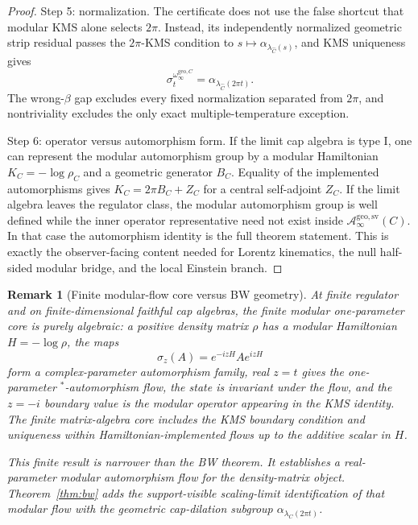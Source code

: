 \documentclass[11pt]{article}
\newtheorem{remark}[theorem]{Remark}
\begin{document}
\begin{proof}
Step 5: normalization. The certificate does not use the false shortcut that modular KMS alone
selects \(2\pi\). Instead, its independently normalized geometric strip residual passes the
\(2\pi\)-KMS condition to \(s\mapsto\alpha_{\lambda_{\widehat C}(s)}\), and KMS uniqueness gives
\[
\sigma_t^{\omega_\infty^{\mathrm{geo},C}}
=
\alpha_{\lambda_{\widehat C}(2\pi t)}.
\]
The wrong-\(\beta\) gap excludes every fixed normalization separated from \(2\pi\), and
nontriviality excludes the only exact multiple-temperature exception.

Step 6: operator versus automorphism form. If the limit cap algebra is type I, one can represent the modular automorphism group by a modular Hamiltonian \(K_C=-\log\rho_C\) and a geometric generator \(B_C\). Equality of the implemented automorphisms gives \(K_C=2\pi B_C+Z_C\) for a central self-adjoint \(Z_C\). If the limit algebra leaves the regulator class, the modular automorphism group is well defined while the inner operator representative need not exist inside \(\mathcal A_\infty^{\mathrm{geo,sv}}(C)\). In that case the automorphism identity is the full theorem statement. This is exactly the observer-facing content needed for Lorentz kinematics, the null half-sided modular bridge, and the local Einstein branch.
\end{proof}

\begin{remark}[Finite modular-flow core versus BW geometry]\label{rem:finite-modular-flow-core}
At finite regulator and on finite-dimensional faithful cap algebras, the
finite modular one-parameter core is purely algebraic: a positive density matrix
\(\rho\) has a modular Hamiltonian \(H=-\log\rho\), the maps
\[
\sigma_z(A)=e^{-izH}Ae^{izH}
\]
form a complex-parameter automorphism family, real \(z=t\) gives the
one-parameter \(^*\)-automorphism flow, the state is invariant under the flow,
and the \(z=-i\) boundary value is the modular operator appearing in the KMS
identity.  The finite matrix-algebra core includes the KMS boundary condition
and uniqueness within Hamiltonian-implemented flows up to the additive scalar
in \(H\).

This finite result is narrower than the BW theorem. It establishes a
real-parameter modular automorphism flow for the density-matrix object. Theorem~\ref{thm:bw}
adds the support-visible scaling-limit identification of that modular flow with the geometric cap-dilation subgroup
\(\alpha_{\lambda_C(2\pi t)}\).
\end{remark}
\end{document}
